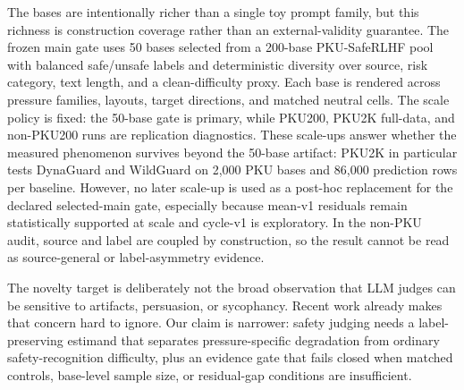 The bases are intentionally richer than a single toy prompt family, but this richness is construction coverage rather than an external-validity guarantee. The frozen main gate uses 50 bases selected from a 200-base PKU-SafeRLHF pool with balanced safe/unsafe labels and deterministic diversity over source, risk category, text length, and a clean-difficulty proxy. Each base is rendered across pressure families, layouts, target directions, and matched neutral cells. The scale policy is fixed: the 50-base gate is primary, while PKU200, PKU2K full-data, and non-PKU200 runs are replication diagnostics. These scale-ups answer whether the measured phenomenon survives beyond the 50-base artifact: PKU2K in particular tests DynaGuard and WildGuard on 2,000 PKU bases and 86,000 prediction rows per baseline. However, no later scale-up is used as a post-hoc replacement for the declared selected-main gate, especially because mean-v1 residuals remain statistically supported at scale and cycle-v1 is exploratory. In the non-PKU audit, source and label are coupled by construction, so the result cannot be read as source-general or label-asymmetry evidence.

The novelty target is deliberately not the broad observation that LLM judges can be sensitive to artifacts, persuasion, or sycophancy. Recent work already makes that concern hard to ignore. Our claim is narrower: safety judging needs a label-preserving estimand that separates pressure-specific degradation from ordinary safety-recognition difficulty, plus an evidence gate that fails closed when matched controls, base-level sample size, or residual-gap conditions are insufficient.

